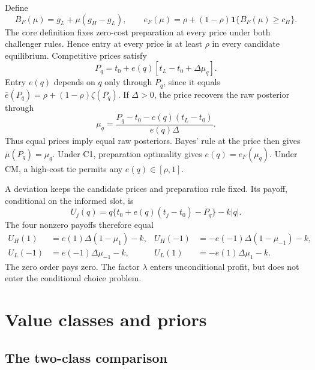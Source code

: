 \documentclass[12pt]{article}
\newcommand{\ind}{\mathbf 1}
\begin{document}
Define
\[
 B_F(\mu)=g_L+\mu(g_H-g_L),\qquad
 e_F(\mu)=\rho+(1-\rho)\ind\{B_F(\mu)\ge c_H\}.
\]
The core definition fixes zero-cost preparation at every price under both challenger rules.
Hence entry at every price is at least $\rho$ in every candidate equilibrium.
Competitive prices satisfy
\begin{equation}\label{eq:price}
 P_q=t_0+e(q)[t_L-t_0+\Delta\mu_q].
\end{equation}
Entry $e(q)$ depends on $q$ only through $P_q$, since it equals $\bar e(P_q)=\rho+(1-\rho)\zeta(P_q)$.
If $\Delta>0$, the price recovers the raw posterior through
\begin{equation}\label{eq:invert}
 \mu_q=\frac{P_q-t_0-e(q)(t_L-t_0)}{e(q)\Delta}.
\end{equation}
Thus equal prices imply equal raw posteriors.
Bayes' rule at the price then gives $\bar\mu(P_q)=\mu_q$.
Under C1, preparation optimality gives $e(q)=e_F(\mu_q)$.
Under CM, a high-cost tie permits any $e(q)\in[\rho,1]$.

A deviation keeps the candidate prices and preparation rule fixed.
Its payoff, conditional on the informed slot, is
\begin{equation}\label{eq:deviation}
 U_j(q)=q\{t_0+e(q)(t_j-t_0)-P_q\}-k|q|.
\end{equation}
The four nonzero payoffs therefore equal
\begin{align}\label{eq:payoffs}
 U_H(1)&=e(1)\Delta(1-\mu_1)-k,&
 U_H(-1)&=-e(-1)\Delta(1-\mu_{-1})-k,\\
 U_L(-1)&=e(-1)\Delta\mu_{-1}-k,&
 U_L(1)&=-e(1)\Delta\mu_1-k.\nonumber
\end{align}
The zero order pays zero.
The factor $\lambda$ enters unconditional profit, but does not enter the conditional choice problem.

\section{Value classes and priors}\label{sec:binary}

\subsection{The two-class comparison}
\end{document}
